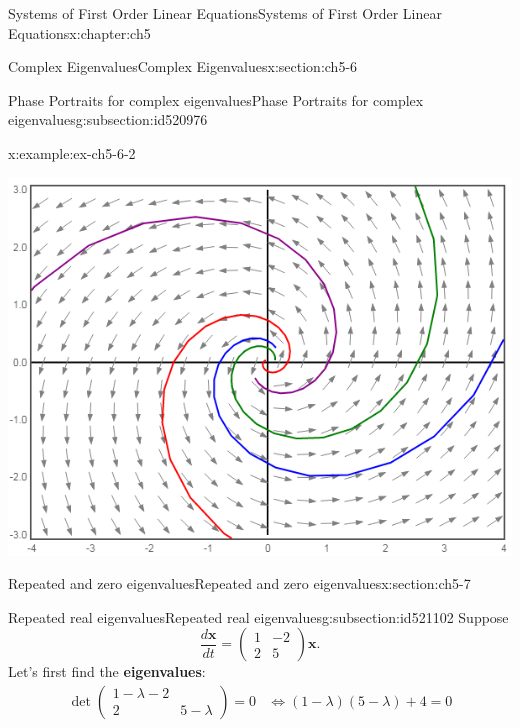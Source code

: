 \documentclass[oneside,10pt,]{book}
\newcommand{\terminology}[1]{\textbf{#1}}
\numberwithin{equation}{section}
\numberwithin{equation}{section}
\newcommand{\amp}{&}
\begin{document}
\begin{chapterptx}{Systems of First Order Linear Equations}{}{Systems of First Order Linear Equations}{}{}{x:chapter:ch5}
\begin{sectionptx}{Complex Eigenvalues}{}{Complex Eigenvalues}{}{}{x:section:ch5-6}
\begin{subsectionptx}{Phase Portraits for complex eigenvalues}{}{Phase Portraits for complex eigenvalues}{}{}{g:subsection:id520976}
\begin{example}{}{x:example:ex-ch5-6-2}
\begin{image}{0}{1}{0}
\includegraphics[width=\linewidth]{images/7.6-1.png}
\end{image}%
%
\end{example}
\end{subsectionptx}
\end{sectionptx}
%
%
\typeout{************************************************}
\typeout{************************************************}
%
\begin{sectionptx}{Repeated and zero eigenvalues}{}{Repeated and zero eigenvalues}{}{}{x:section:ch5-7}
%
%
\typeout{************************************************}
\typeout{************************************************}
%
\begin{subsectionptx}{Repeated real eigenvalues}{}{Repeated real eigenvalues}{}{}{g:subsection:id521102}
Suppose%
\begin{equation*}
\frac{d\mathbf{x}}{dt}=\left(\begin{array}{cc}
1 \amp -2\\
2 \amp 5
\end{array}\right)\mathbf{x}.
\end{equation*}
Let's first find the \terminology{eigenvalues}:%
\begin{align*}
\det\left(\begin{array}{cc}
1-\lambda  -2\\
2 \amp 5-\lambda
\end{array}\right)=0 
\amp \iff  \left(1-\lambda\right)\left(5-\lambda\right)+4=0\\

\end{align*}
\end{subsectionptx}
\end{sectionptx}
\end{chapterptx}
\end{document}

